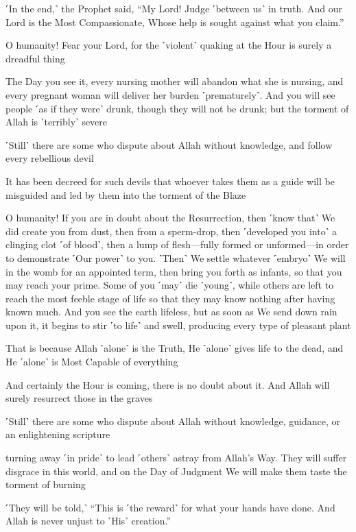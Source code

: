 ˹In the end,˺ the Prophet said, “My Lord! Judge ˹between us˺ in truth. And our Lord is the Most Compassionate, Whose help is sought against what you claim.”

O humanity! Fear your Lord, for the ˹violent˺ quaking at the Hour is surely a dreadful thing

The Day you see it, every nursing mother will abandon what she is nursing, and every pregnant woman will deliver her burden ˹prematurely˺. And you will see people ˹as if they were˺ drunk, though they will not be drunk; but the torment of Allah is ˹terribly˺ severe

˹Still˺ there are some who dispute about Allah without knowledge, and follow every rebellious devil

It has been decreed for such devils that whoever takes them as a guide will be misguided and led by them into the torment of the Blaze

O humanity! If you are in doubt about the Resurrection, then ˹know that˺ We did create you from dust, then from a sperm-drop, then ˹developed you into˺ a clinging clot ˹of blood˺, then a lump of flesh—fully formed or unformed—in order to demonstrate ˹Our power˺ to you. ˹Then˺ We settle whatever ˹embryo˺ We will in the womb for an appointed term, then bring you forth as infants, so that you may reach your prime. Some of you ˹may˺ die ˹young˺, while others are left to reach the most feeble stage of life so that they may know nothing after having known much. And you see the earth lifeless, but as soon as We send down rain upon it, it begins to stir ˹to life˺ and swell, producing every type of pleasant plant

That is because Allah ˹alone˺ is the Truth, He ˹alone˺ gives life to the dead, and He ˹alone˺ is Most Capable of everything

And certainly the Hour is coming, there is no doubt about it. And Allah will surely resurrect those in the graves

˹Still˺ there are some who dispute about Allah without knowledge, guidance, or an enlightening scripture

turning away ˹in pride˺ to lead ˹others˺ astray from Allah’s Way. They will suffer disgrace in this world, and on the Day of Judgment We will make them taste the torment of burning

˹They will be told,˺ “This is ˹the reward˺ for what your hands have done. And Allah is never unjust to ˹His˺ creation.”

